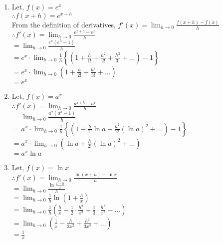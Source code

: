 \documentclass[12pt]{article}
\newcommand{\tab}{\hspace*{0.55in}}
\begin{document}
\begin{enumerate}
    \item
    Let, $ f(x) = e^x $ \\
    $ \therefore f(x+h) = e^{x+h}$ \\
    From the definition of derivatives, $ f'(x) = \lim_{h \to 0} \frac{f(x+h) - f(x)}{h} $ \\
    $ \therefore f'(x) = \lim_{h \to 0} \frac{e^{x+h} - e^x}{h} $ \\
    \tab $ = \lim_{h \to 0} \frac{e^x(e^h -1)}{h} $ \\
    \tab $ = e^x \cdot \lim_{h \to 0} \frac{1}{h} \left\{ \left( 1 + \frac{h}{1!} + \frac{h^2}{2!} + \frac{h^3}{3!} + \ldots \right) - 1 \right\} $ \\
    \tab $ = e^x \cdot \lim_{h \to 0} \left( 1 + \frac{h}{2!} + \frac{h^2}{3!} + \ldots \right) $ \\
    \tab $ = e^x $

    \item
    Let, $ f(x) = a^x $ \\
    $ \therefore f'(x) = \lim_{h \to 0} \frac{a^{x+h} - a^x}{h} $ \\
    \tab $ = \lim_{h \to 0} \frac{a^x (a^h - 1)}{h}$ \\
    \tab $ = a^x \cdot \lim_{h \to 0} \frac{1}{h} \left\{ \left( 1 + \frac{h}{1!} \ln a + \frac{h^2}{2!} (\ln a)^2 + \ldots \right) - 1 \right\}$ \\
    \tab $ = a^x \cdot \lim_{h \to 0} \left( \ln a + \frac{h}{2!} (\ln a)^2 + \ldots \right) $ \\
    \tab $ = a^x \ln a $

    \item
    Let, $ f(x) = \ln x $ \\
    $ \therefore f'(x) = \lim_{h \to 0} \frac{\ln(x+h)-\ln x}{h} $ \\
    \tab $ = \lim_{h \to 0} \frac{\ln \frac{x+h}{x}}{h} $ \\
    \tab $ = \lim_{h \to 0} \frac{1}{h} \ln \left( 1 + \frac{h}{x} \right) $ \\
    \tab $ = \lim_{h \to 0} \frac{1}{h} \left( \frac{h}{x} - \frac{1}{2} \cdot \frac{h^2}{x^2} + \frac{1}{3} \cdot \frac{h^3}{x^3} - \ldots \right) $ \\
    \tab $ = \lim_{h \to 0} \left( \frac{1}{x} - \frac{h}{2x^2} + \frac{h^2}{3x^3} - \ldots \right)$ \\
    \tab $ = \frac{1}{x} $


\end{enumerate}
\end{document}

